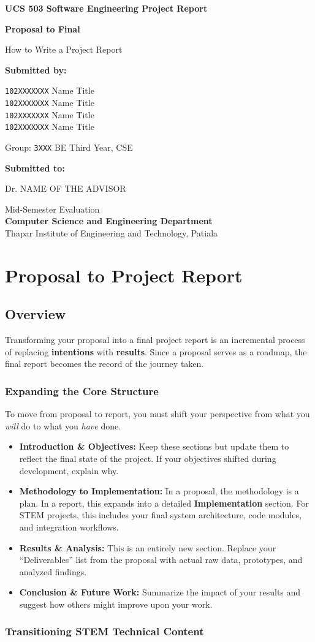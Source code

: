 \documentclass[twoside,12pt,openright]{report}
\newcommand{\TitlePageHeader}{%
  UCS 503 Software Engineering Project Report%
}
\newcommand{\ProjectTitle}{Proposal to Final}
\newcommand{\ProjectSubTitle}{How to Write a Project Report}
\renewcommand{\author}{%
\texttt{102XXXXXXX} {Name Title} \\
\texttt{102XXXXXXX} {Name Title} \\
\texttt{102XXXXXXX} {Name Title} \\
\texttt{102XXXXXXX} {Name Title} \\
}
\newcommand{\TitlePageSubText}{%
  Group: \texttt{3XXX} BE Third Year, CSE%
}
\newcommand{\AdvisorName}{Dr. NAME OF THE ADVISOR}
\newcommand{\TitlePageFooterText}{{%
    \large Mid-Semester Evaluation \\[0.2cm]
    \bfseries Computer Science and Engineering
    Department%
  } \\[0.15cm]
  Thapar Institute of Engineering and
  Technology, Patiala%
}
\renewcommand{\maketitle}{%
  \begin{titlepage}
    \thispagestyle{empty}
    \centering
    \vspace*{0.5cm}

    {\large \textbf{\TitlePageHeader}}

    \vspace{2cm}
    {\LARGE \textbf{\ProjectTitle}}

    \vspace{0.2cm}
    {\ProjectSubTitle}

    \vspace{3.5cm}
    {\large \textbf{Submitted by:}}

    \vspace{0.2cm}
    {\large \author}

    \vspace{0.5cm}
    {\normalsize \TitlePageSubText}

    \vfill

    {\large \textbf{Submitted to:}}

    \vspace{0.2cm}
    {\normalsize \AdvisorName}

    \vspace{2cm}
    {\normalsize \TitlePageFooterText}
  \end{titlepage}

  \newpage
  \thispagestyle{empty}%
}
\begin{document}
\maketitle
\tableofcontents

\chapter{Proposal to Project Report}

\section{Overview}

Transforming your proposal into a final project report is an incremental process
of replacing \textbf{intentions} with \textbf{results}. Since a proposal serves as
a roadmap, the final report becomes the record of the journey taken.

\subsection{Expanding the Core Structure}

To move from proposal to report, you must shift your perspective from what you
\textit{will} do to what you \textit{have} done.

\begin{itemize}
  \item \textbf{Introduction \& Objectives:} Keep these sections but update them
    to reflect the final state of the project. If your objectives shifted during
    development, explain why.
  \item \textbf{Methodology to Implementation:} In a proposal, the methodology is
    a plan. In a report, this expands into a detailed \textbf{Implementation}
    section. For STEM projects, this includes your final system architecture,
    code modules, and integration workflows.
  \item \textbf{Results \& Analysis:} This is an entirely new section. Replace
    your ``Deliverables'' list from the proposal with actual raw data,
    prototypes, and analyzed findings.
  \item \textbf{Conclusion \& Future Work:} Summarize the impact of your results
    and suggest how others might improve upon your work.
\end{itemize}

\subsection{Transitioning STEM Technical Content}
\end{document}
